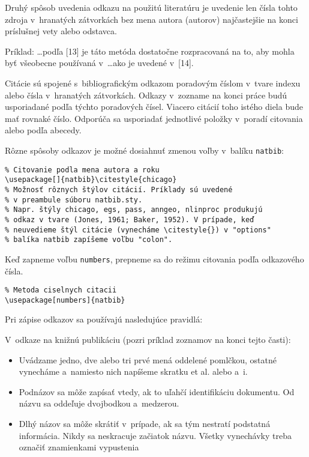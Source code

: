 Druhý spôsob uvedenia odkazu na použitú literatúru je uvedenie len
čísla tohto zdroja v~hranatých zátvorkách bez mena autora (autorov)
najčastejšie na konci príslušnej vety alebo odstavca.

\medskip

Príklad:
\dots podľa [13] je táto metóda dostatočne rozpracovaná na to, aby
mohla byť\/ všeobecne používaná v~\dots ako je uvedené v~[14].

\medskip

Citácie sú spojené s~bibliografickým odkazom poradovým číslom v~tvare
indexu alebo čísla v~hranatých zátvorkách. Odkazy v~zozname na konci
práce budú usporiadané podľa týchto poradových čísel. Viacero citácií
toho istého diela bude mať\/ rovnaké číslo. Odporúča sa usporiadať\/
jednotlivé položky v~poradí citovania alebo podľa abecedy.

\medskip
\noindent
Rôzne spôsoby odkazov je možné dosiahnuť\/ zmenou voľby v~balíku
\verb+natbib+:

\noindent
\verb+% Citovanie podla mena autora a roku+\\
\verb+\usepackage[]{natbib}\citestyle{chicago}+\\
\verb+% Možnosť rôznych štýlov citácií. Príklady sú uvedené+\\
\verb+% v preambule súboru natbib.sty.+\\
\verb+% Napr. štýly chicago, egs, pass, anngeo, nlinproc produkujú+\\
\verb+% odkaz v tvare (Jones, 1961; Baker, 1952). V prípade, keď+\\
\verb+% neuvedieme štýl citácie (vynecháme \citestyle{}) v "options"+\\
\verb+% balíka natbib zapíšeme voľbu "colon".+

\medskip
\noindent
Keď zapneme voľbu \verb+numbers+, prepneme sa do režimu citovania
podľa odkazového čísla.

\noindent
\verb+% Metoda ciselnych citacii+\\
\verb+\usepackage[numbers]{natbib}+

\bigskip

Pri zápise odkazov sa používajú nasledujúce pravidlá:

V~odkaze na knižnú publikáciu (pozri príklad zoznamov na konci tejto
časti):
\begin{itemize}
\item Uvádzame jedno, dve alebo tri prvé mená oddelené pomlčkou,
ostatné vynecháme a~namiesto nich napíšeme skratku et al. alebo a~i.
\item Podnázov sa môže zapísať\/ vtedy, ak to uľahčí identifikáciu
dokumentu. Od názvu sa oddeľuje dvojbodkou a~medzerou.
\item Dlhý názov sa môže skrátiť\/ v~prípade, ak sa tým nestratí
podstatná informácia. Nikdy sa neskracuje začiatok názvu. Všetky
vynechávky treba označiť\/ znamienkami vypustenia  \uv{\dots}
\end{itemize}

